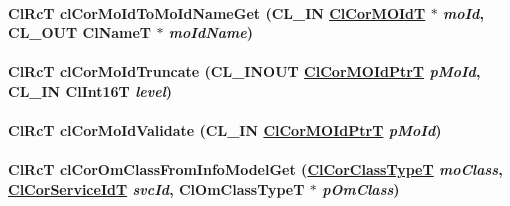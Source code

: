 \hypertarget{group__group13_ga117}{
\paragraph[clCorMoIdToMoIdNameGet]{\setlength{\rightskip}{0pt plus 5cm}Cl\-Rc\-T cl\-Cor\-Mo\-Id\-To\-Mo\-Id\-Name\-Get (CL\_\-IN \hyperlink{struct_cl_cor_m_o_id}{Cl\-Cor\-MOId\-T} $\ast$ {\em mo\-Id}, CL\_\-OUT Cl\-Name\-T $\ast$ {\em mo\-Id\-Name})}\hfill}
\label{group__group13_ga117}


\hypertarget{group__group13_ga110}{
\paragraph[clCorMoIdTruncate]{\setlength{\rightskip}{0pt plus 5cm}Cl\-Rc\-T cl\-Cor\-Mo\-Id\-Truncate (CL\_\-INOUT \hyperlink{struct_cl_cor_m_o_id}{Cl\-Cor\-MOId\-Ptr\-T} {\em p\-Mo\-Id}, CL\_\-IN Cl\-Int16T {\em level})}\hfill}
\label{group__group13_ga110}


\hypertarget{group__group13_ga120}{
\paragraph[clCorMoIdValidate]{\setlength{\rightskip}{0pt plus 5cm}Cl\-Rc\-T cl\-Cor\-Mo\-Id\-Validate (CL\_\-IN \hyperlink{struct_cl_cor_m_o_id}{Cl\-Cor\-MOId\-Ptr\-T} {\em p\-Mo\-Id})}\hfill}
\label{group__group13_ga120}


\hypertarget{group__group13_ga87}{
\paragraph[clCorOmClassFromInfoModelGet]{\setlength{\rightskip}{0pt plus 5cm}Cl\-Rc\-T cl\-Cor\-Om\-Class\-From\-Info\-Model\-Get (\hyperlink{group__group13_ga2}{Cl\-Cor\-Class\-Type\-T} {\em mo\-Class}, \hyperlink{group__group13_ga339}{Cl\-Cor\-Service\-Id\-T} {\em svc\-Id}, Cl\-Om\-Class\-Type\-T $\ast$ {\em p\-Om\-Class})}\hfill}
\label{group__group13_ga87}


